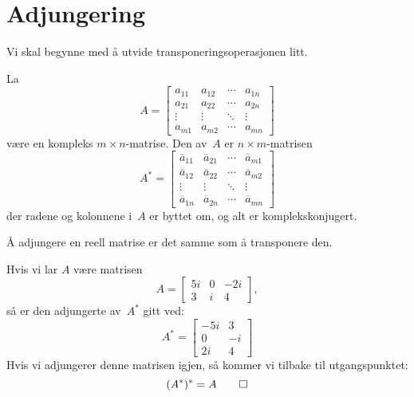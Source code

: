 

\label{ch:projeksjon}

\section*{Adjungering}

Vi skal begynne med å utvide transponeringsoperasjonen litt. 

\begin{defn}
La
\[
A =
\begin{bmatrix}
a_{11} & a_{12} & \cdots & a_{1n} \\
a_{21} & a_{22} & \cdots & a_{2n} \\
\vdots & \vdots & \ddots & \vdots \\
a_{m1} & a_{m2} & \cdots & a_{mn}
\end{bmatrix}
\]
være en kompleks $m \times n$-matrise.  Den  av~$A$ er
$n \times m$-matrisen
\[
A^* =
\begin{bmatrix}
\overline a_{11} & \overline a_{21} & \cdots & \overline a_{m1} \\
\overline a_{12} & \overline a_{22} & \cdots & \overline a_{m2} \\
\vdots & \vdots & \ddots & \vdots \\
\overline a_{1n} & \overline a_{2n} & \cdots & \overline a_{mn}
\end{bmatrix}
\]
der radene og kolonnene i~$A$ er byttet om, og alt er komplekskonjugert.
\end{defn}

\begin{merkx}
Å adjungere en reell matrise er det samme som å transponere den.
\end{merkx}


\begin{ex}
Hvis vi lar $A$ være matrisen
\[
A =
\begin{bmatrix}
5i & 0 & -2i \\
3 & i &  4
\end{bmatrix},
\]
så er den adjungerte av~$A^*$ gitt ved:
\[
A^* =
\begin{bmatrix}
 -5i & 3 \\
 0 & -i \\
2i & 4
\end{bmatrix}
\]
Hvis vi adjungerer denne matrisen igjen, så kommer vi tilbake til
utgangspunktet:
\[
(A^*)^* = A\qedhere
\]
\end{ex}

